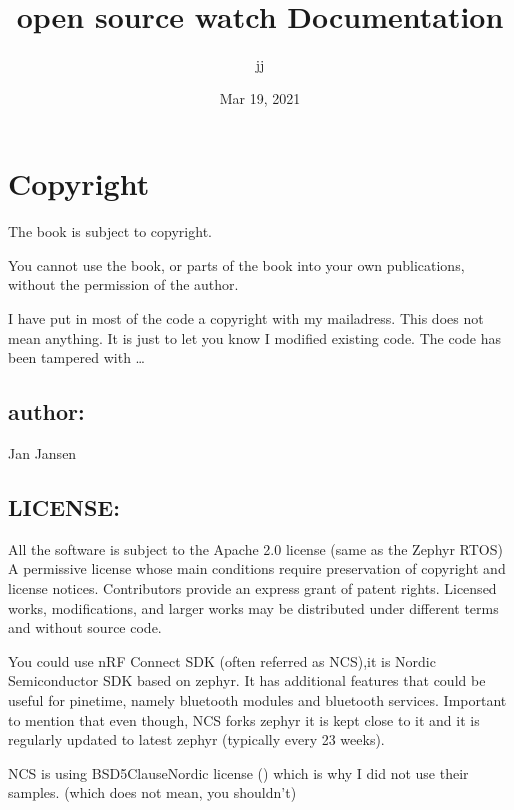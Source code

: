 \documentclass[letterpaper,10pt,english]{sphinxmanual}
\title{open source watch Documentation}
\date{Mar 19, 2021}
\author{jj}
\begin{document}
\pagestyle{empty}
\sphinxmaketitle
\pagestyle{plain}
\sphinxtableofcontents
\pagestyle{normal}
\label{\detokenize{index::doc}}
\noindent{}




\chapter{Copyright}
\label{\detokenize{copyright:copyright}}\label{\detokenize{copyright::doc}}
The book is subject to copyright.

You cannot use the book, or parts of the book into your own publications, without the permission of the author.

I have put in most of the code a copyright with my mailadress.
This does not mean anything. It is just to let you know I modified existing code. The code has been tampered with …


\section{author:}
\label{\detokenize{copyright:author}}
Jan Jansen


\section{LICENSE:}
\label{\detokenize{copyright:license}}
All the software is subject to the Apache 2.0 license (same as the Zephyr RTOS)
A permissive license whose main conditions require preservation of copyright and license notices. Contributors provide an express grant of patent rights. Licensed works, modifications, and larger works may be distributed under different terms and without source code.

You could use nRF Connect SDK (often referred as NCS),it is Nordic Semiconductor SDK based on zephyr. It has additional features that could be useful for pinetime, namely bluetooth modules and bluetooth services. Important to mention that even though, NCS forks zephyr it is kept close to it and it is regularly updated to latest zephyr (typically every 2\sphinxhyphen{}3 weeks).

NCS is using BSD\sphinxhyphen{}5\sphinxhyphen{}Clause\sphinxhyphen{}Nordic license ()
which is why I did not use their samples. (which does not mean, you shouldn’t)
\end{document}
